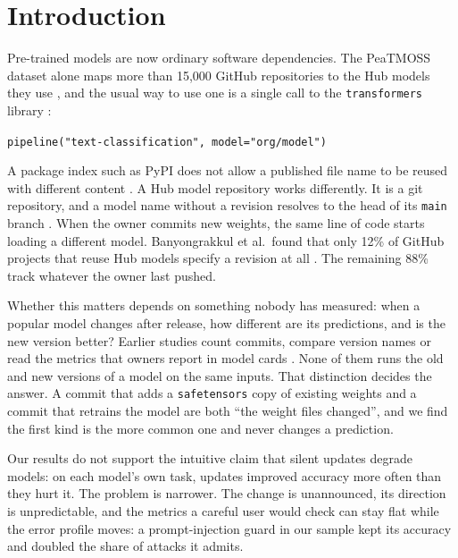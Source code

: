 \documentclass[conference]{IEEEtran}
\newcommand{\code}[1]{\texttt{#1}}
\begin{document}
\section{Introduction}

Pre-trained models are now ordinary software dependencies. The PeaTMOSS dataset alone maps more than 15,000 GitHub repositories to the Hub models they use \cite{peatmoss}, and the usual way to use one is a single call to the \code{transformers} library \cite{wolf2020}:

\begin{center}
\code{pipeline("text-classification", model="org/model")}
\end{center}

A package index such as PyPI does not allow a published file name to be reused with different content \cite{pypi-reuse}. A Hub model repository works differently. It is a git repository, and a model name without a revision resolves to the head of its \code{main} branch \cite{hf-repos}. When the owner commits new weights, the same line of code starts loading a different model. Banyongrakkul et al.\ found that only 12\% of GitHub projects that reuse Hub models specify a revision at all \cite{banyongrakkul2026}. The remaining 88\% track whatever the owner last pushed.

Whether this matters depends on something nobody has measured: when a popular model changes after release, how different are its predictions, and is the new version better? Earlier studies count commits, compare version names or read the metrics that owners report in model cards \cite{castano2024,ajibode2024,jia2025}. None of them runs the old and new versions of a model on the same inputs. That distinction decides the answer. A commit that adds a \code{safetensors} copy of existing weights and a commit that retrains the model are both ``the weight files changed'', and we find the first kind is the more common one and never changes a prediction.

Our results do not support the intuitive claim that silent updates degrade models: on each model's own task, updates improved accuracy more often than they hurt it. The problem is narrower. The change is unannounced, its direction is unpredictable, and the metrics a careful user would check can stay flat while the error profile moves: a prompt-injection guard in our sample kept its accuracy and doubled the share of attacks it admits.
\end{document}
